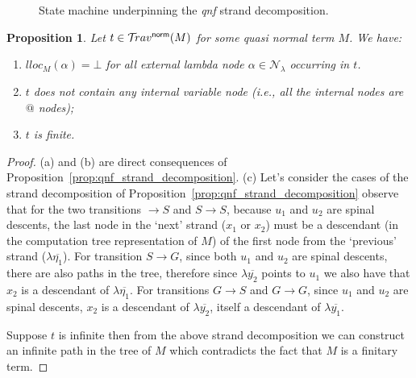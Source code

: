 \documentclass{article}
\makeatletter
\theoremstyle{plain}
\newtheorem{proposition}[theorem]{Proposition}
\theoremstyle{definition}
\theoremstyle{remark}
\newcommand\Nodes{\mathcal{N}}%
\newcommand\NodesLmd{\Nodes_\lambda}%
\newcommand{\ghostlmd}{{\lambda\!\!\lambda}}
\newcommand{\normalizing}{{\sf norm}}
\newcommand{\travsetnorm}{\travset^\normalizing}
\renewcommand\ie{{\it i.e.\@\xspace}}
\makeatother
\begin{document}
\begin{figure}[htbp]
\centering
{}
\caption{State machine underpinning the \emph{qnf} strand decomposition.}
\label{fig:qnf_strand_decomposition_statemachine}
\end{figure}



\begin{proposition}
\label{prop:qnf_traversals_are_finite}
Let $t \in \travsetnorm(M)$ for some \emph{quasi normal} term $M$. We have:
\begin{enumerate}[label=(\alph*)]
\item $lloc_M(\alpha) = \bot$ for all external lambda node $\alpha \in \NodesLmd$ occurring in $t$.
\item $t$ does not contain any internal variable node (\ie, all the internal nodes are $@$ nodes);
\item $t$ is finite.
\end{enumerate}
\end{proposition}
\begin{proof}
(a) and (b) are direct consequences of Proposition~\ref{prop:qnf_strand_decomposition}.
(c) Let's consider the cases of the strand decomposition of Proposition~\ref{prop:qnf_strand_decomposition}
observe that for the two transitions $\rightarrow S$ and $S \rightarrow S$, because $u_1$ and $u_2$ are spinal descents, the last node in the `next' strand ($x_1$ or $x_2$) must be a descendant (in the computation tree representation of $M$) of the first node from the `previous' strand ($\lambda\overline{\eta_1}$).
For transition $S\rightarrow G$, since both $u_1$ and $u_2$ are spinal descents, there are also paths in the tree, therefore since $\lambda\overline{y_2}$ points to $u_1$ we also have that $x_2$ is a descendant of $\lambda\overline{\eta_1}$. For transitions
$G \rightarrow S$ and $G \rightarrow G$, since $u_1$ and $u_2$ are spinal descents, $x_2$ is a descendant of $\lambda\overline{y_2}$, itself a descendant of $\lambda\overline{y_1}$.

Suppose $t$ is infinite then from the above strand decomposition we can construct an infinite path in the tree of $M$ which contradicts the fact that $M$ is a finitary term.
\end{proof}
\end{document}
